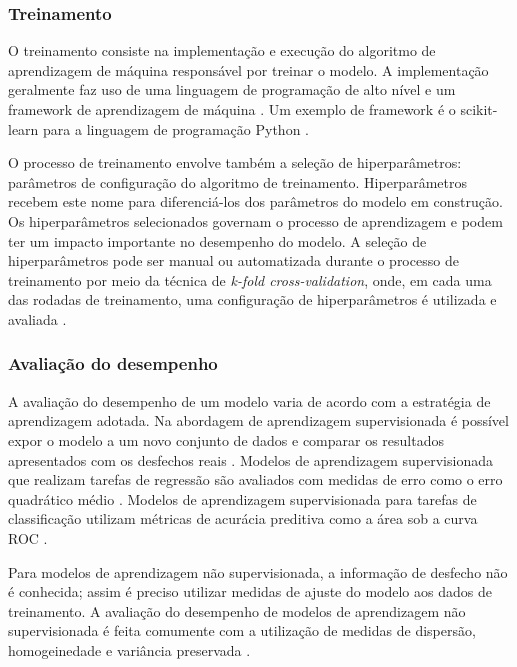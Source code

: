 \subsubsection{Treinamento}

O treinamento consiste na implementação e execução do algoritmo de aprendizagem de máquina responsável por treinar o modelo. A implementação geralmente faz uso de
uma linguagem de programação de alto nível e um framework de aprendizagem de máquina \cite{Greener2021}. Um exemplo de framework é o scikit-learn \cite{ScikitLearn}
para a linguagem de programação Python \cite{Python}.

O processo de treinamento envolve também a seleção de hiperparâmetros: parâmetros de configuração do algoritmo de treinamento. Hiperparâmetros recebem este nome para
diferenciá-los dos parâmetros do modelo em construção. Os hiperparâmetros selecionados governam o processo de aprendizagem e podem ter um impacto importante no desempenho
do modelo. A seleção de hiperparâmetros pode ser manual ou automatizada durante o processo de treinamento por meio da técnica de \textit{k-fold cross-validation}, onde,
em cada uma das rodadas de treinamento, uma configuração de hiperparâmetros é utilizada e avaliada \cite{Delgadillo2020}.

\subsubsection{Avaliação do desempenho}

A avaliação do desempenho de um modelo varia de acordo com a estratégia de aprendizagem adotada. Na abordagem de aprendizagem supervisionada é possível expor o modelo a um
novo conjunto de dados e comparar os resultados apresentados com os desfechos reais \cite{Greener2021}. Modelos de aprendizagem supervisionada que realizam tarefas de regressão
são avaliados com medidas de erro como o erro quadrático médio \cite{Delgadillo2020}. Modelos de aprendizagem supervisionada para tarefas de classificação utilizam métricas de
acurácia preditiva como a área sob a curva ROC \cite{Greener2021}.

Para modelos de aprendizagem não supervisionada, a informação de desfecho não é conhecida; assim é preciso utilizar medidas de ajuste do modelo aos dados de treinamento. 
A avaliação do desempenho de modelos de aprendizagem não supervisionada é feita comumente com a utilização de medidas de dispersão, homogeinedade e variância preservada
\cite{Naeem2023}.